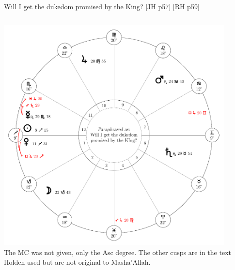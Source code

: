 \begin{frame}[t]{Will I get the dukedom promised by the King? [JH p57] [RH p59]}
\begin{columns}[T, onlytextwidth]
\begin{center}
{\includegraphics[width=0.9\textwidth]{charts/52-chart-dukedom}} \\
\scriptsize
The MC was not given, only the Asc degree. The other cusps are in the text Holden used but are not original to Masha'Allah.
\end{center}
\end{columns}

\end{frame}
